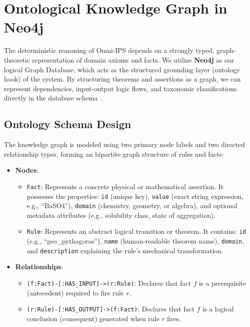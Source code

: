 \section{Ontological Knowledge Graph in Neo4j}
\label{sec:knowledge_graph}

The deterministic reasoning of Omni-IPS depends on a strongly typed, graph-theoretic representation of domain axioms and facts. We utilize \textbf{Neo4j} as our logical Graph Database, which acts as the structured grounding layer (ontology hook) of the system. By structuring theorems and assertions as a graph, we can represent dependencies, input-output logic flows, and taxonomic classifications directly in the database schema~\cite{pan2024unifying}.

\subsection{Ontology Schema Design}
The knowledge graph is modeled using two primary node labels and two directed relationship types, forming an bipartite graph structure of rules and facts:
\begin{itemize}
    \item \textbf{Nodes}:
        \begin{itemize}
            \item \texttt{Fact}: Represents a concrete physical or mathematical assertion. It possesses the properties: \texttt{id} (unique key), \texttt{value} (exact string expression, e.g., ``BaSO4''), \texttt{domain} (chemistry, geometry, or algebra), and optional metadata attributes (e.g., solubility class, state of aggregation).
            \item \texttt{Rule}: Represents an abstract logical transition or theorem. It contains: \texttt{id} (e.g., ``geo\_pythagoras''), \texttt{name} (human-readable theorem name), \texttt{domain}, and \texttt{description} explaining the rule's mechanical transformation.
        \end{itemize}
    \item \textbf{Relationships}:
        \begin{itemize}
            \item \texttt{(f:Fact)-[:HAS\_INPUT]->(r:Rule)}: Declares that fact $f$ is a prerequisite (antecedent) required to fire rule $r$.
            \item \texttt{(r:Rule)-[:HAS\_OUTPUT]->(f:Fact)}: Declares that fact $f$ is a logical conclusion (consequent) generated when rule $r$ fires.
        \end{itemize}
\end{itemize}

